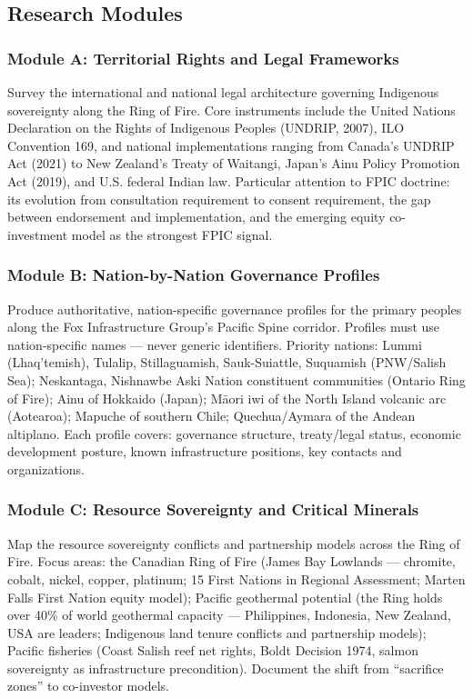 \documentclass[11pt,letterpaper]{article}
\begin{document}
\subsection{Research Modules}

\subsubsection{Module A: Territorial Rights and Legal Frameworks}

Survey the international and national legal architecture governing Indigenous sovereignty along the Ring of Fire. Core instruments include the United Nations Declaration on the Rights of Indigenous Peoples (UNDRIP, 2007), ILO Convention 169, and national implementations ranging from Canada's UNDRIP Act (2021) to New Zealand's Treaty of Waitangi, Japan's Ainu Policy Promotion Act (2019), and U.S. federal Indian law. Particular attention to FPIC doctrine: its evolution from consultation requirement to consent requirement, the gap between endorsement and implementation, and the emerging equity co-investment model as the strongest FPIC signal.

\subsubsection{Module B: Nation-by-Nation Governance Profiles}

Produce authoritative, nation-specific governance profiles for the primary peoples along the Fox Infrastructure Group's Pacific Spine corridor. Profiles must use nation-specific names --- never generic identifiers. Priority nations: Lummi (Lhaq'temish), Tulalip, Stillaguamish, Sauk-Suiattle, Suquamish (PNW/Salish Sea); Neskantaga, Nishnawbe Aski Nation constituent communities (Ontario Ring of Fire); Ainu of Hokkaido (Japan); Māori iwi of the North Island volcanic arc (Aotearoa); Mapuche of southern Chile; Quechua/Aymara of the Andean altiplano. Each profile covers: governance structure, treaty/legal status, economic development posture, known infrastructure positions, key contacts and organizations.

\subsubsection{Module C: Resource Sovereignty and Critical Minerals}

Map the resource sovereignty conflicts and partnership models across the Ring of Fire. Focus areas: the Canadian Ring of Fire (James Bay Lowlands --- chromite, cobalt, nickel, copper, platinum; 15 First Nations in Regional Assessment; Marten Falls First Nation equity model); Pacific geothermal potential (the Ring holds over 40\% of world geothermal capacity --- Philippines, Indonesia, New Zealand, USA are leaders; Indigenous land tenure conflicts and partnership models); Pacific fisheries (Coast Salish reef net rights, Boldt Decision 1974, salmon sovereignty as infrastructure precondition). Document the shift from ``sacrifice zones'' to co-investor models.
\end{document}
